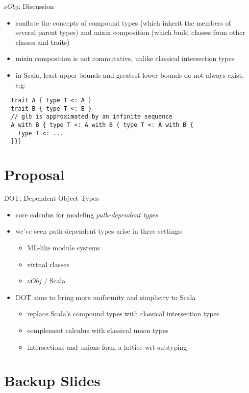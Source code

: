 \documentclass{beamer}
\begin{document}
\begin{frame}[fragile]{${\nu}Obj$: Discussion}
\begin{itemize}
\item conflate the concepts of compound types (which inherit the
  members of several parent types) and mixin composition (which build
  classes from other classes and traits)
\item mixin composition is not commutative, unlike classical
  intersection types
\item in Scala, least upper bounds and greatest lower bounds do not always exist, e.g: %
\end{itemize}
\begin{verbatim}
  trait A { type T <: A }
  trait B { type T <: B }
  // glb is approximated by an infinite sequence
  A with B { type T <: A with B { type T <: A with B {
    type T <: ...
  }}}
\end{verbatim}
\end{frame}

\section{Proposal}
\begin{frame}{DOT: Dependent Object Types}
\begin{itemize}
\item core calculus for modeling {\it path-dependent types}
\item we've seen path-dependent types arise in three settings:
\begin{itemize}
\item ML-like module systems
\item virtual classes
\item ${\nu}Obj$ / Scala
\end{itemize}
\item DOT aims to bring more uniformity and simplicity to Scala
\begin{itemize}
\item replace Scala's compound types with classical intersection types
\item complement calculus with classical union types
\item intersections and unions form a lattice wrt subtyping
\end{itemize}
\end{itemize}
\end{frame}

\section{Backup Slides}

\end{document}
